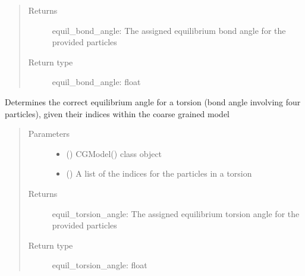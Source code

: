 \documentclass[letterpaper,12pt,english,openany,oneside]{sphinxmanual}
\begin{document}
\begin{fulllineitems}
\begin{fulllineitems}
\begin{quote}
\begin{description}
\item[{Returns}] \leavevmode
equil\_bond\_angle: The assigned equilibrium bond angle for the provided particles

\item[{Return type}] \leavevmode
equil\_bond\_angle: float

\end{description}\end{quote}

\end{fulllineitems}


\begin{fulllineitems}
\label{\detokenize{cg_model:cg_model.cgmodel.CGModel.get_equil_torsion_angle}}
Determines the correct equilibrium angle for a torsion (bond angle involving four particles), given their indices within the coarse grained model
\begin{quote}\begin{description}
\item[{Parameters}] \leavevmode\begin{itemize}
\item {} 
 () \textendash{} CGModel() class object

\item {} 
 (\sphinxstyleliteralemphasis{\sphinxupquote{( }}\sphinxstyleliteralemphasis{\sphinxupquote{ )}}) \textendash{} A list of the indices for the particles in a torsion

\end{itemize}

\item[{Returns}] \leavevmode
equil\_torsion\_angle: The assigned equilibrium torsion angle for the provided particles

\item[{Return type}] \leavevmode
equil\_torsion\_angle: float

\end{description}\end{quote}


\end{fulllineitems}
\end{fulllineitems}
\end{document}
